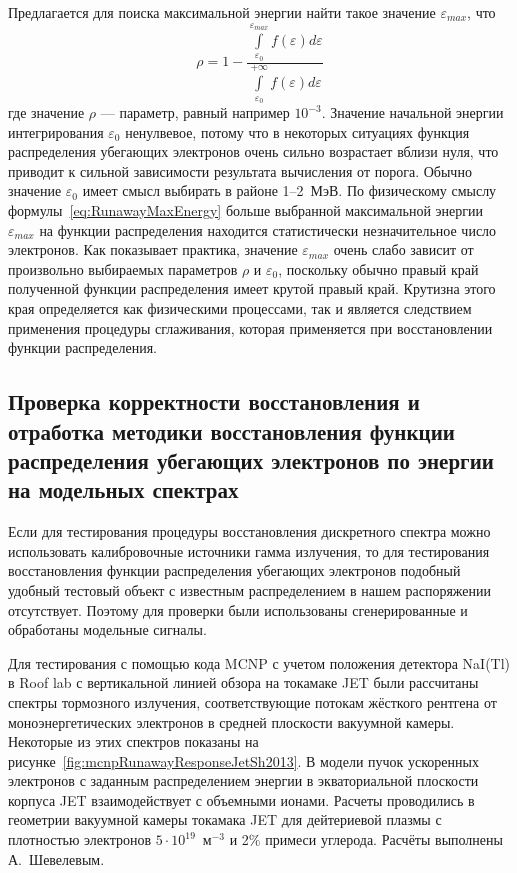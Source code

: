 Предлагается для поиска максимальной энергии найти такое значение $\varepsilon_{max}$, что
\begin{equation}
  \label{eq:RunawayMaxEnergy}
  \rho = 1 - \frac{ \int \limits_{\varepsilon_0}^{\varepsilon_{max}} f(\varepsilon) d\varepsilon }{ \int \limits_{\varepsilon_0}^{+\infty} f(\varepsilon) d\varepsilon }
\end{equation}
где значение $\rho$ --- параметр, равный например $10^{-3}$. Значение начальной энергии интегрирования $\varepsilon_0$ ненулвевое, потому что в некоторых ситуациях функция распределения убегающих электронов очень сильно возрастает вблизи нуля, что приводит к сильной зависимости результата вычисления от порога. Обычно значение $\varepsilon_0$ имеет смысл выбирать в районе 1--2~МэВ. По физическому смыслу формулы~\ref{eq:RunawayMaxEnergy} больше выбранной максимальной энергии $\varepsilon_{max}$ на функции распределения находится статистически незначительное число электронов. Как показывает практика, значение $\varepsilon_{max}$ очень слабо зависит от произвольно выбираемых параметров $\rho$ и $\varepsilon_0$, поскольку обычно правый край полученной функции распределения имеет крутой правый край. Крутизна этого края определяется как физическими процессами, так и является следствием применения процедуры сглаживания, которая применяется при восстановлении функции распределения.~\cite{Shevelev2017}


\subsection{ Проверка корректности восстановления и отработка методики восстановления функции распределения убегающих электронов по энергии на модельных спектрах }

Если для тестирования процедуры восстановления дискретного спектра можно использовать калибровочные источники гамма излучения, то для тестирования восстановления функции распределения убегающих электронов подобный удобный тестовый объект с известным распределением в нашем распоряжении отсутствует. Поэтому для проверки были использованы сгенерированные и обработаны модельные сигналы.

Для тестирования с помощью кода MCNP с учетом положения детектора NaI(Tl) в Roof lab с вертикальной линией обзора на токамаке JET были рассчитаны спектры тормозного излучения, соответствующие потокам жёсткого рентгена от моноэнергетических электронов в средней плоскости вакуумной камеры. Некоторые из этих спектров показаны на рисунке~\ref{fig:mcnpRunawayResponseJetSh2013}. В модели пучок ускоренных электронов с заданным распределением энергии в экваториальной плоскости корпуса JET взаимодействует с объемными ионами. Расчеты проводились в геометрии вакуумной камеры токамака JET для дейтериевой плазмы с плотностью электронов $ 5 \cdot 10^{19}$~м${}^{-3}$ и 2\% примеси углерода. Расчёты выполнены А.~Шевелевым.~\cite{Shevelev2013} 

